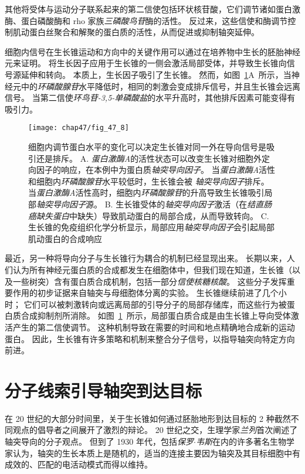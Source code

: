 其他将受体与运动分子联系起来的第二信使包括环状核苷酸，它们调节诸如蛋白激酶、蛋白磷酸酶和 rho 家族\textit{三磷酸鸟苷}酶的活性。
反过来，这些信使和酶调节控制肌动蛋白丝聚合和解聚的蛋白质的活性，从而促进或抑制轴突延伸。


细胞内信号在生长锥运动和方向中的关键作用可以通过在培养物中生长的胚胎神经元来证明。
将生长因子应用于生长锥的一侧会激活局部受体，并导致生长锥向信号源延伸和转向。
本质上，生长因子吸引了生长锥。
然而，如图~\ref{fig:47_8}A~所示，当神经元中的\textit{环磷酸腺苷}水平降低时，相同的刺激会变成排斥信号，并且生长锥会远离信号。
当第二信使\textit{环鸟苷-3,5-单磷酸盐}的水平升高时，其他排斥因素可能变得有吸引力。


\begin{figure}[htbp]
	\centering
	\texttt{[image: chap47/fig\_47\_8]}
	\caption{细胞内调节蛋白水平的变化可以决定生长锥对同一外在导向信号是吸引还是排斥。
		A. \textit{蛋白激酶A}的活性状态可以改变生长锥对细胞外定向因子的响应，在本例中为蛋白质\textit{轴突导向因子}。
		当\textit{蛋白激酶A}活性和细胞内\textit{环磷酸腺苷}水平较低时，生长锥会被 \textit{轴突导向因子}排斥。
		当\textit{蛋白激酶A}活性高时，细胞内\textit{环磷酸腺苷}的升高导致生长锥吸引局部\textit{轴突导向因子}源\cite{ming1997camp}。
		B. 生长锥受体的\textit{轴突导向因子}激活（在\textit{结直肠癌缺失蛋白}中缺失）导致肌动蛋白的局部合成，从而导致转向。
		C. 生长锥的免疫组织化学分析显示，局部应用\textit{轴突导向因子}会引起局部肌动蛋白的合成响应\cite{leung2006asymmetrical} }
	\label{fig:47_8}
\end{figure}


最近，另一种将导向分子与生长锥行为耦合的机制已经显现出来。
长期以来，人们认为所有神经元蛋白质的合成都发生在细胞体中，但我们现在知道，生长锥（以及一些树突）含有蛋白质合成机制，包括一部分\textit{信使核糖核酸}。
这些分子发挥重要作用的初步证据来自轴突与母细胞体分离的实验。
生长锥继续前进了几个小时； 它们可以被刺激转向或远离局部的引导分子的局部存储库，而这些行为被蛋白质合成抑制剂所消除。
如图~\ref{fig:47_8}~所示，局部蛋白质合成是由生长锥上导向受体激活产生的第二信使调节。
这种机制导致在需要的时间和地点精确地合成新的运动蛋白。
因此，生长锥有许多策略和机制来整合分子信号，以指导轴突向特定方向前进。



\section{分子线索引导轴突到达目标}

在 20 世纪的大部分时间里，关于生长锥如何通过胚胎地形到达目标的 2 种截然不同观点的倡导者之间展开了激烈的辩论。
20 世纪之交，生理学家\textit{兰列}首次阐述了轴突导向的分子观点。
但到了 1930 年代，包括\textit{保罗$\cdot$韦斯}在内的许多著名生物学家认为，轴突的生长本质上是随机的，适当的连接主要因为轴突及其目标细胞中有成效的、匹配的电活动模式而得以维持。


